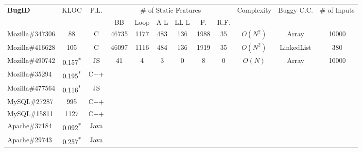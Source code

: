 \begin{table}[h!]
  \centering
  \scriptsize
  \newcommand{\Yes}[1]{\checkmark{}$_#1$}
  \newcommand{\No}[0]{-}
  \begin{tabular}{lccccccccccc}
    \toprule     
    {\bf BugID}                   & KLOC  &  P.L.    & \multicolumn{6}{c}{\# of Static Features}    &   Complexity  & Buggy C.C.        & \# of Inputs \\
                           
    \cmidrule(lr){4-9}
                                 &        &          &  BB      &  Loop     & A-L    &  LL-L    &  F.  & R.F.    &           &        &  \\
    \midrule 

    Mozilla\#347306              &  88    & C        &   46735  &   1177     &  483    &  136    &  1988  & 35   &  $O(N^{2})$ &  Array  & 10000   \\
    Mozilla\#416628              &  105   & C        &   46097  &   1116     &  484    &  136    &  1919  &  35  &  $O(N^{2})$  &  LinkedList & 380  \\
    Mozilla\#490742              &  0.157\textsuperscript{*}  & JS  &  41 & 4 &  3  &   0   &  8   &  0   & $O(N)$   &  Array  &  10000              \\
    Mozilla\#35294    &  0.195\textsuperscript{*}  & C++  &  &              &    &                                 &                   &                           &                     &&          \\
    Mozilla\#477564   &  0.116\textsuperscript{*}  & JS  &  &              &    &                                 &                   &                           &                      &&          \\
    \midrule
    MySQL\#27287      &  995  & C++  &  &              &    &                                 &                   &                           &                   &&             \\
    MySQL\#15811      &  1127 & C++  &  &              &    &                                 &                   &                           &                   &&             \\
    \midrule
    Apache\#37184     &  0.092\textsuperscript{*} & Java  &  &              &    &                                 &                   &                           &                    &&           \\ 
    Apache\#29743     &  0.257\textsuperscript{*}  & Java  &  &              &    &                                 &                   &                           &                    &&          \\

\end{tabular}
\end{table}
